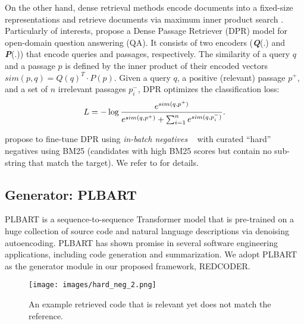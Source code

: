 \documentclass[11pt]{article}
\newcommand{\tool}{{REDCODER}\xspace}
\begin{document}
On the other hand, dense retrieval methods encode documents into a fixed-size representations and retrieve documents via maximum inner product search \cite{NIPS2014_a14ac55a, guo2016quantization}. 
Particularly of interests, \citet{karpukhin-etal-2020-dense} propose a Dense Passage Retriever (DPR) model for open-domain question answering (QA). 
It consists of two encoders (\textbf{\it Q}(.) and \textbf{\it P}(.)) that encode queries and passages, respectively. 
The similarity of a query $q$ and a passage $p$ is defined by the inner product of their encoded vectors $sim(p,q)=Q(q)^T \cdot P(p)$.
Given a query $q$, a positive (relevant) passage $p^+$, and a set of $n$ irrelevant passages $p_i^-$, DPR optimizes the classification loss: 
\begin{equation*}
\setlength{\belowdisplayskip}{5pt}
\setlength{\abovedisplayskip}{5pt}
\label{eq:loss-ori-dpr}
    \begin{split}
    L = - \log \frac{e^{sim(q,p^+)}}{e^{sim(q,p^+)} + \sum_{i=1}^n e^{sim(q,p_i^-)}}.
 \end{split}
\end{equation*}


\citet{karpukhin-etal-2020-dense} propose to fine-tune DPR using \emph{in-batch negatives} ~\cite{gillick-etal-2019-learning, yih2011learning} with curated ``hard'' negatives using BM25 (candidates with high BM25 scores but contain no sub-string  that match the target). 
We refer to \citet{karpukhin-etal-2020-dense} for  details.





\subsection{Generator: PLBART }
\label{sec:background-plbart}





PLBART \cite{ahmad2021unified} is a sequence-to-sequence Transformer model \cite{vaswani2017attention} that is pre-trained on a huge collection of source code and natural language descriptions via denoising autoencoding.
PLBART has shown promise in several software engineering applications, including code generation and summarization. We adopt PLBART as the generator module in our proposed framework, \tool.




%
 \begin{figure}[!t]
\captionsetup[subfigure]{labelformat=empty}
\centering
\texttt{[image: images/hard\_neg\_2.png]}
\caption{An example  retrieved code that is relevant yet does not match the reference.}
\vspace{-2mm}
\label{figure:targetvsret}
\end{figure}
\end{document}
